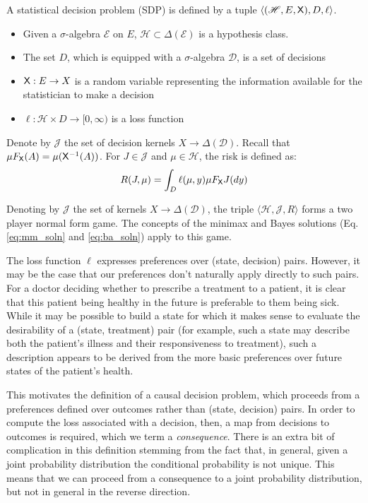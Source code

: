 \begin{definition}
A statistical decision problem (SDP) is defined by a tuple $\langle (\mathscr{H},E, \mathsf{X}), D, \ell\rangle$.
\begin{itemize}
    \item Given a $\sigma$-algebra $\mathcal{E}$ on $E$, $\mathscr{H}\subset\Delta(\mathcal{E})$ is a hypothesis class.
    \item The set $D$, which is equipped with a $\sigma$-algebra $\mathcal{D}$, is a set of decisions
    \item $\mathsf{X}:E\to X$ is a random variable representing the information available for the statistician to make a decision
    \item $\ell:\mathcal{H}\times D\to [0,\infty)$ is a loss function
\end{itemize}

Denote by $\mathscr{J}$ the set of decision kernels $X\to \Delta(\mathcal{D})$. Recall that $\mu F_{\mathsf{X}}(A)=\mu(\mathsf{X}^{-1}(A))$. For $J\in \mathscr{J}$ and $\mu\in \mathcal{H}$, the risk is defined as:
\begin{align}
    R(J,\mu) = \int_D \ell(\mu,y) \mu F_{\mathsf{X}} J(dy)
\end{align}


Denoting by $\mathscr{J}$  the set of kernels $X\to \Delta(\mathcal{D})$, the triple $\langle \mathscr{H}, \mathscr{J}, R\rangle$ forms a two player normal form game. The concepts of the minimax and Bayes solutions (Eq. \ref{eq:mm_soln} and \ref{eq:ba_soln}) apply to this game.
\end{definition}

The loss function $\ell$ expresses preferences over (state, decision) pairs. However, it may be the case that our preferences don't naturally apply directly to such pairs. For a doctor deciding whether to prescribe a treatment to a patient, it is clear that this patient being healthy in the future is preferable to them being sick. While it may be possible to build a state for which it makes sense to evaluate the desirability of a (state, treatment) pair (for example, such a state may describe both the patient's illness and their responsiveness to treatment), such a description appears to be derived from the more basic preferences over future states of the patient's health.

This motivates the definition of a causal decision problem, which proceeds from a preferences defined over outcomes rather than (state, decision) pairs. In order to compute the loss associated with a decision, then, a map from decisions to outcomes is required, which we term a \emph{consequence}. There is an extra bit of complication in this definition stemming from the fact that, in general, given a joint probability distribution the conditional probability is not unique. This means that we can proceed from a consequence to a joint probability distribution, but not in general in the reverse direction.

